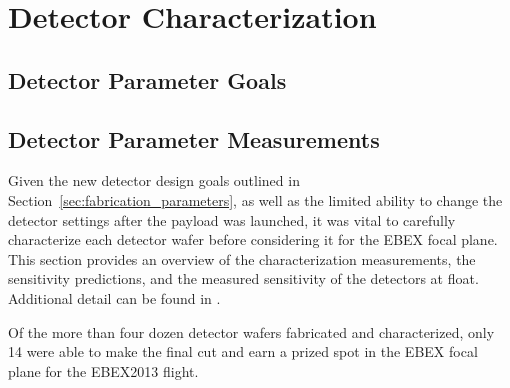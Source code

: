 \chapter{Detector Characterization}
\label{charecterization_chapter}




\section{Detector Parameter Goals}
\label{parameter_goals_section}



\section{Detector Parameter Measurements}
\label{parameter_measurements_section}



Given the new detector design goals outlined in Section~\ref{sec:fabrication_parameters}, as well as the limited ability to change the detector settings after the payload was launched, it was vital to carefully characterize each detector wafer before considering it for the \ac{EBEX} focal plane. This section provides an overview of the characterization measurements, the sensitivity predictions, and the measured sensitivity of the detectors at float. Additional detail can be found in \cite{aubin_thesis} \cite{MacDermid_thesis} \cite{MacDermid_SPIE2014}.

Of the more than four dozen detector wafers fabricated and characterized, only 14 were able to make the final cut and earn a prized spot in the \ac{EBEX} focal plane for the \ac{EBEX2013} flight. 

